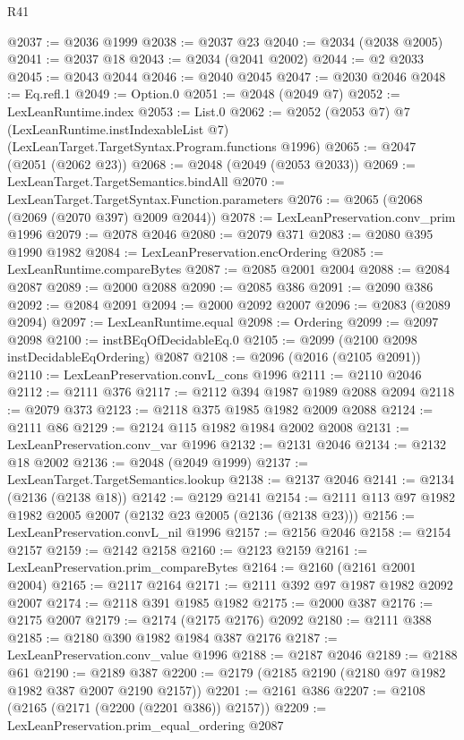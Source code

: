 \begin{lexlean}{R41}
\begin{coremodule}
@2037 := @2036 @1999
@2038 := @2037 @23
@2040 := @2034 (@2038 @2005)
@2041 := @2037 @18
@2043 := @2034 (@2041 @2002)
@2044 := @2 @2033
@2045 := @2043 @2044
@2046 := @2040 @2045
@2047 := @2030 @2046
@2048 := Eq.refl.{1}
@2049 := Option.{0}
@2051 := @2048 (@2049 @7)
@2052 := LexLeanRuntime.index
@2053 := List.{0}
@2062 := @2052
    (@2053 @7)
    @7
    (LexLeanRuntime.instIndexableList @7)
    (LexLeanTarget.TargetSyntax.Program.functions @1996)
@2065 := @2047 (@2051 (@2062 @23))
@2068 := @2048 (@2049 (@2053 @2033))
@2069 := LexLeanTarget.TargetSemantics.bindAll
@2070 := LexLeanTarget.TargetSyntax.Function.parameters
@2076 := @2065 (@2068 (@2069 (@2070 @397) @2009 @2044))
@2078 := LexLeanPreservation.conv_prim @1996
@2079 := @2078 @2046
@2080 := @2079 @371
@2083 := @2080 @395 @1990 @1982
@2084 := LexLeanPreservation.encOrdering
@2085 := LexLeanRuntime.compareBytes
@2087 := @2085 @2001 @2004
@2088 := @2084 @2087
@2089 := @2000 @2088
@2090 := @2085 @386
@2091 := @2090 @386
@2092 := @2084 @2091
@2094 := @2000 @2092 @2007
@2096 := @2083 (@2089 @2094)
@2097 := LexLeanRuntime.equal
@2098 := Ordering
@2099 := @2097 @2098
@2100 := instBEqOfDecidableEq.{0}
@2105 := @2099 (@2100 @2098 instDecidableEqOrdering) @2087
@2108 := @2096 (@2016 (@2105 @2091))
@2110 := LexLeanPreservation.convL_cons @1996
@2111 := @2110 @2046
@2112 := @2111 @376
@2117 := @2112 @394 @1987 @1989 @2088 @2094
@2118 := @2079 @373
@2123 := @2118 @375 @1985 @1982 @2009 @2088
@2124 := @2111 @86
@2129 := @2124 @115 @1982 @1984 @2002 @2008
@2131 := LexLeanPreservation.conv_var @1996
@2132 := @2131 @2046
@2134 := @2132 @18 @2002
@2136 := @2048 (@2049 @1999)
@2137 := LexLeanTarget.TargetSemantics.lookup
@2138 := @2137 @2046
@2141 := @2134 (@2136 (@2138 @18))
@2142 := @2129 @2141
@2154 := @2111 @113 @97 @1982 @1982 @2005 @2007 (@2132 @23 @2005 (@2136 (@2138 @23)))
@2156 := LexLeanPreservation.convL_nil @1996
@2157 := @2156 @2046
@2158 := @2154 @2157
@2159 := @2142 @2158
@2160 := @2123 @2159
@2161 := LexLeanPreservation.prim_compareBytes
@2164 := @2160 (@2161 @2001 @2004)
@2165 := @2117 @2164
@2171 := @2111 @392 @97 @1987 @1982 @2092 @2007
@2174 := @2118 @391 @1985 @1982
@2175 := @2000 @387
@2176 := @2175 @2007
@2179 := @2174 (@2175 @2176) @2092
@2180 := @2111 @388
@2185 := @2180 @390 @1982 @1984 @387 @2176
@2187 := LexLeanPreservation.conv_value @1996
@2188 := @2187 @2046
@2189 := @2188 @61
@2190 := @2189 @387
@2200 := @2179 (@2185 @2190 (@2180 @97 @1982 @1982 @387 @2007 @2190 @2157))
@2201 := @2161 @386
@2207 := @2108 (@2165 (@2171 (@2200 (@2201 @386)) @2157))
@2209 := LexLeanPreservation.prim_equal_ordering @2087

\end{coremodule}
\end{lexlean}
